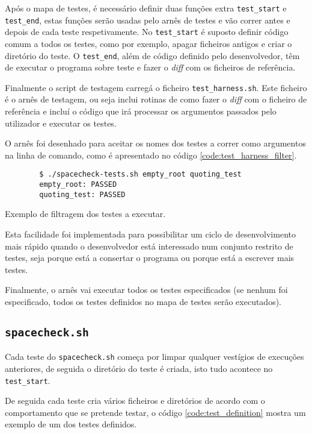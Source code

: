 Após o mapa de testes, é necessário definir duas funções extra \Verb|test_start|
e \Verb|test_end|, estas funções serão usadas pelo arnês de testes e vão correr
antes e depois de cada teste respetivamente. No \Verb|test_start| é suposto
definir código comum a todos os testes, como por exemplo, apagar ficheiros
antigos e criar o diretório do teste. O \Verb|test_end|, além de código definido
pelo desenvolvedor, têm de executar o programa sobre teste e fazer o \emph{diff}
com os ficheiros de referência.

Finalmente o script de testagem carregá o ficheiro \Verb|test_harness.sh|. Este
ficheiro é o arnês de testagem, ou seja inclui rotinas de como fazer o
\emph{diff} com o ficheiro de referência e incluí o código que irá processar
os argumentos passados pelo utilizador e executar os testes.

O arnês foi desenhado para aceitar os nomes dos testes a correr como argumentos
na linha de comando, como é apresentado no código \ref{code:test_harness_filter}.

\begin{listing}[H]
	\centering
	\begin{verbatim}
		$ ./spacecheck-tests.sh empty_root quoting_test
		empty_root: PASSED
		quoting_test: PASSED
	\end{verbatim}
	\cprotect\caption{Exemplo de filtragem dos testes a executar.}
	\label{code:test_harness_filter}
\end{listing}

Esta facilidade foi implementada para possibilitar um ciclo de desenvolvimento
mais rápido quando o desenvolvedor está interessado num conjunto restrito de
testes, seja porque está a consertar o programa ou porque está a escrever mais
testes.

Finalmente, o arnês vai executar todos os testes especificados (se nenhum foi
especificado, todos os testes definidos no mapa de testes serão executados).

\cprotect\subsection{\Verb|spacecheck.sh|}

Cada teste do \Verb|spacecheck.sh| começa por limpar
qualquer vestígios de execuções anteriores, de seguida o diretório do teste
é criada, isto tudo acontece no \Verb|test_start|.

De seguida cada teste cria vários ficheiros e diretórios de acordo com o
comportamento que se pretende testar, o código \ref{code:test_definition} mostra
um exemplo de um dos testes definidos.

